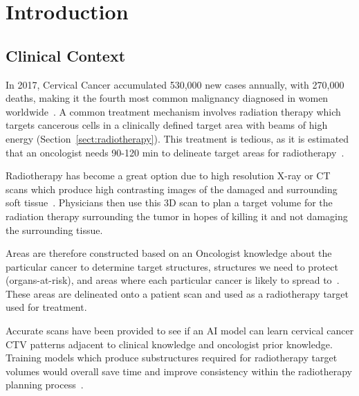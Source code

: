 \documentclass[12pt,twoside]{report}
\begin{document}
\chapter{Introduction}\label{sect:intro}

\setcounter{page}{1}
\fancyhead[LE,RO]{\slshape \rightmark}
\fancyhead[LO,RE]{\slshape \leftmark}

\section{Clinical Context}



In 2017, Cervical Cancer accumulated 530,000 new cases annually, with 270,000 deaths, making it the fourth most common malignancy diagnosed in women worldwide~\cite{cervical-cancer-epidemic}. A common treatment mechanism involves radiation therapy which targets cancerous cells in a clinically defined target area with beams of high energy (Section~\ref{sect:radiotherapy}). This treatment is tedious, as it is estimated that an oncologist needs 90-120 min to delineate target areas for radiotherapy~\cite{LIU2020184}.

Radiotherapy has become a great option due to high resolution X-ray or CT scans which produce high contrasting images of the damaged and surrounding soft tissue~\cite{radiotherapy-basic-concepts}. Physicians then use this 3D scan to plan a target volume for the radiation therapy surrounding the tumor in hopes of killing it and not damaging the surrounding tissue.

Areas are therefore constructed based on an Oncologist knowledge about the particular cancer to determine target structures, structures we need to protect (organs-at-risk), and areas where each particular cancer is likely to spread to~\cite{AMLART-data}. These areas are delineated onto a patient scan and used as a radiotherapy target used for treatment.

Accurate scans have been provided to see if an AI model can learn cervical cancer CTV patterns adjacent to clinical knowledge and oncologist prior knowledge. Training models which produce substructures required for radiotherapy target volumes would overall save time and improve consistency within the radiotherapy planning process~\cite{AMLART-data}.

\end{document}
